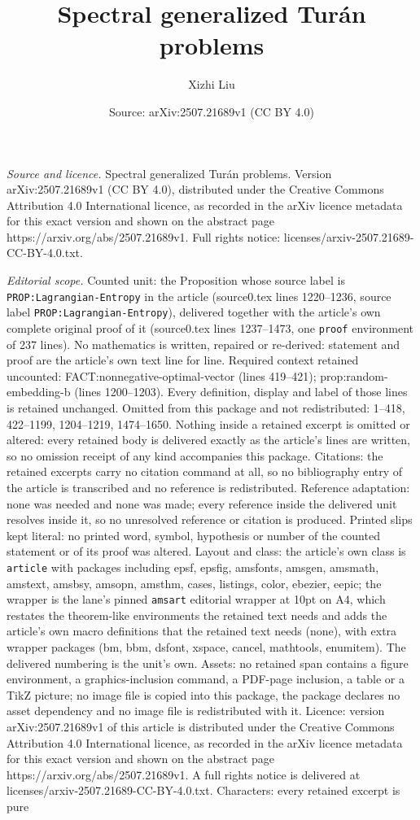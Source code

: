 \documentclass[10pt,a4paper]{amsart}
\title[Spectral generalized Tur\'{a}n problems]{Spectral generalized Tur\'{a}n problems}
\author{Xizhi Liu}
\date{Source: arXiv:2507.21689v1 (CC BY 4.0)}
\begin{document}
\maketitle

\noindent\emph{Source and licence.} Spectral generalized Tur\'{a}n problems. Version arXiv:2507.21689v1 (CC BY 4.0), distributed under the Creative Commons Attribution 4.0 International licence, as recorded in the arXiv licence metadata for this exact version and shown on the abstract page https://arxiv.org/abs/2507.21689v1. Full rights notice: licenses/arxiv-2507.21689-CC-BY-4.0.txt.\par\smallskip

\noindent\textit{Editorial scope.} Counted unit: the Proposition whose source label is \texttt{PROP:Lagrangian-Entropy} in the article (source0.tex lines 1220--1236, source label \texttt{PROP:Lagrangian-Entropy}), delivered together with the article's own complete original proof of it (source0.tex lines 1237--1473, one \texttt{proof} environment of 237 lines). No mathematics is written, repaired or re-derived: statement and proof are the article's own text line for line. Required context retained uncounted: FACT:nonnegative-optimal-vector (lines 419--421); prop:random-embedding-b (lines 1200--1203). Every definition, display and label of those lines is retained unchanged. Omitted from this package and not redistributed: 1--418, 422--1199, 1204--1219, 1474--1650. Nothing inside a retained excerpt is omitted or altered: every retained body is delivered exactly as the article's lines are written, so no omission receipt of any kind accompanies this package. Citations: the retained excerpts carry no citation command at all, so no bibliography entry of the article is transcribed and no reference is redistributed. Reference adaptation: none was needed and none was made; every reference inside the delivered unit resolves inside it, so no unresolved reference or citation is produced. Printed slips kept literal: no printed word, symbol, hypothesis or number of the counted statement or of its proof was altered. Layout and class: the article's own class is \texttt{article} with packages including epsf, epsfig, amsfonts, amsgen, amsmath, amstext, amsbsy, amsopn, amsthm, cases, listings, color, ebezier, eepic; the wrapper is the lane's pinned \texttt{amsart} editorial wrapper at 10pt on A4, which restates the theorem-like environments the retained text needs and adds the article's own macro definitions that the retained text needs (none), with extra wrapper packages (bm, bbm, dsfont, xspace, cancel, mathtools, enumitem). The delivered numbering is the unit's own. Assets: no retained span contains a figure environment, a graphics-inclusion command, a PDF-page inclusion, a table or a TikZ picture; no image file is copied into this package, the package declares no asset dependency and no image file is redistributed with it. Licence: version arXiv:2507.21689v1 of this article is distributed under the Creative Commons Attribution 4.0 International licence, as recorded in the arXiv licence metadata for this exact version and shown on the abstract page https://arxiv.org/abs/2507.21689v1. A full rights notice is delivered at licenses/arxiv-2507.21689-CC-BY-4.0.txt. Characters: every retained excerpt is pure 
\end{document}
